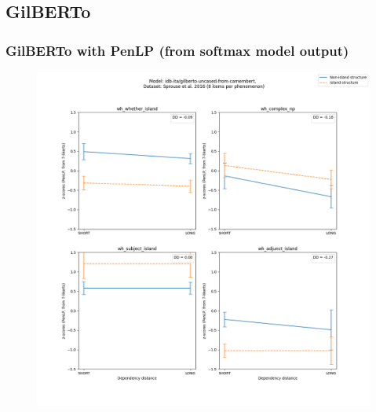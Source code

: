 \clearpage
\subsection{GilBERTo}

\subsubsection{GilBERTo with PenLP (from softmax model output)}
\begin{figure}[h]
	\centering
	\includegraphics[width=1\textwidth]{images/AppendixA/Sprouse_wh_idb-ita_gilberto-uncased-from-camembert_PenLP-zscores-likert-2022-07-11.png} 
\end{figure}

\clearpage
